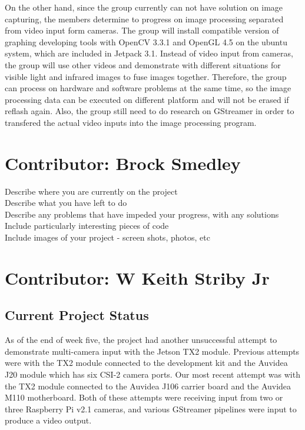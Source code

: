 \documentclass[letterpaper,10pt,serif,draftclsnofoot,onecolumn,compsoc,titlepage]{IEEEtran}
\begin{document}
 On the other hand, since the group currently can not have solution on image capturing, the members 
 determine to progress on image processing separated from video input form cameras. The group will 
 install compatible version of graphing developing tools with OpenCV 3.3.1 and OpenGL 4.5 on the ubuntu 
 system, which are included in Jetpack 3.1. Instead of video input from cameras, the group will use 
 other videos and demonstrate with different situations for visible light and infrared images to fuse 
 images together. Therefore, the group can process on hardware and software problems at the same time, 
 so the image processing data can be executed on different platform and will not be erased if reflash again. 
 Also, the group still need to do research on GStreamer in order to transfered the actual video inputs 
 into the image processing program.\\


\section{Contributor: Brock Smedley}
Describe where you are currently on the project \\

Describe what you have left to do \\

Describe any problems that have impeded your progress, with any solutions \\

Include particularly interesting pieces of code \\

Include images of your project - screen shots, photos, etc \\


\section{Contributor: W Keith Striby Jr}

\subsection{Current Project Status}

As of the end of week five, the project had another unsuccessful attempt to demonstrate 
multi-camera input with the Jetson TX2 module. Previous attempts were with the TX2 module
connected to the development kit and the Auvidea J20 module which has six CSI-2 camera 
ports. Our most recent attempt was with the TX2 module connected to the Auvidea J106 
carrier board and the Auvidea M110 motherboard. Both of these attempts were receiving 
input from two or three Raspberry Pi v2.1 cameras, and various GStreamer 
pipelines were input to produce a video output. \\
\end{document}
